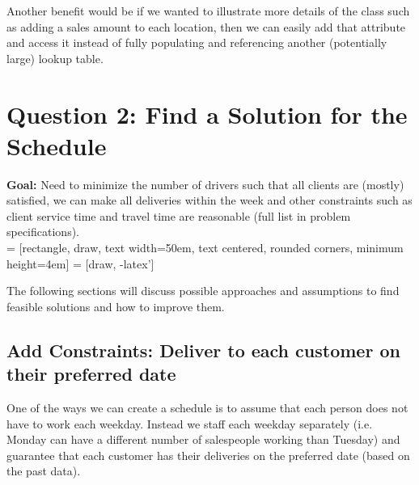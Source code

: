 \documentclass{article}
\begin{document}
Another benefit would be if we wanted to illustrate more details of the class such as adding a sales amount to each location, then we can easily add that attribute and access it instead of fully populating and referencing another (potentially large) lookup table.\\

\section{Question 2: Find a Solution for the Schedule}
\textbf{Goal:} Need to minimize the number of drivers such that all clients are
(mostly) satisfied, we can make all deliveries within the week and other constraints
such as client service time and travel time are reasonable (full list in problem specifications).\\

 = [rectangle, draw, 
text width=50em, text centered, rounded corners, minimum height=4em]
 = [draw, -latex']


The following sections will discuss possible approaches and assumptions to find feasible solutions and how to improve them.

\subsection{Add Constraints: Deliver to each customer on their preferred date}
One of the ways we can create a schedule is to assume that each person does not have to work each weekday.  Instead we staff each weekday separately (i.e. Monday can have a different number of salespeople working than Tuesday) and guarantee that each customer has their deliveries on the preferred date (based on the past data).\\  
\end{document}
